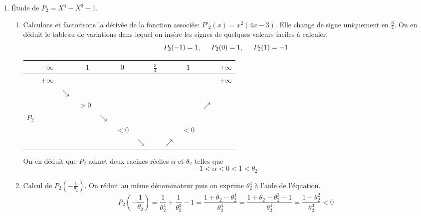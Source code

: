 \begin{enumerate}
 \item \'Etude de $P_2=X^4-X^3-1$.
\begin{enumerate}
 \item Calculons et factorisons la dérivée de la fonction associée: $P'_2(x)=x^2(4x-3)$. Elle change de signe uniquement en $\frac{3}{4}$. On en déduit le tableau de variations dans lequel on insère les signes de quelques valeurs faciles à calculer.
\begin{displaymath}
 P_2(-1)=1,\hspace{0.5cm}P_2(0)=1,\hspace{0.5cm}P_2(1)=-1
\end{displaymath}
\begin{center}
\renewcommand{\arraystretch}{1.8}
\begin{tabular}{|c|ccccccccccc|}  \hline
      &$-\infty$&          &$-1$&          &$0$ &          &$\frac{3}{4}$&          &$1$ &          &$+\infty$ \\ \hline
      &$+\infty$&          &    &          &    &          &             &          &    &          &$+\infty$ \\
      &         &$\searrow$&    &          &    &          &             &          &    &          & \\
      &         &          &$>0$&          &    &          &             &          &    &$\nearrow$& \\
 $P_2$&         &          &    &$\searrow$&    &          &             &          &    &          & \\
      &         &          &    &          &$<0$&          &             &          &$<0$&          & \\
      &         &          &    &          &    &$\searrow$&             &$\nearrow$&    &          & \\ \hline
\end{tabular}
\end{center}
On en déduit que $P_2$ admet deux racines réelles $\alpha$ et $\theta_2$ telles que
\begin{displaymath}
 -1<\alpha<0<1<\theta_2
\end{displaymath}
 \item Calcul de $P_2(-\frac{1}{\theta_2})$. On réduit au même dénominateur puis on exprime $\theta_2^4$ à l'aide de l'équation.
\begin{displaymath}
 P_2(-\frac{1}{\theta_2}) = \frac{1}{\theta_2^4} + \frac{1}{\theta_2^3}-1
= \frac{1+\theta_2 - \theta_2^4}{\theta_2^4}
=\frac{1+\theta_2 - \theta_2^3-1}{\theta_2^4}
=\frac{1 - \theta_2^2}{\theta_2^3}<0
\end{displaymath}


\end{enumerate}
\end{enumerate}
